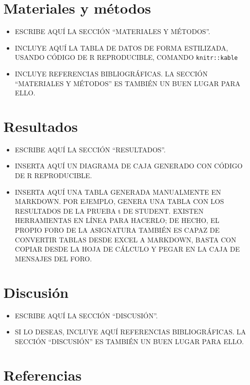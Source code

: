 \documentclass[spanish]{article}
\begin{document}
\section{Materiales y métodos}\label{materiales-y-muxe9todos}

\begin{itemize}
\item
  ESCRIBE AQUÍ LA SECCIÓN ``MATERIALES Y MÉTODOS''.
\item
  INCLUYE AQUÍ LA TABLA DE DATOS DE FORMA ESTILIZADA, USANDO CÓDIGO DE R
  REPRODUCIBLE, COMANDO \texttt{knitr::kable}
\item
  INCLUYE REFERENCIAS BIBLIOGRÁFICAS. LA SECCIÓN ``MATERIALES Y
  MÉTODOS'' ES TAMBIÉN UN BUEN LUGAR PARA ELLO.
\end{itemize}

\section{Resultados}\label{resultados}

\begin{itemize}
\item
  ESCRIBE AQUÍ LA SECCIÓN ``RESULTADOS''.
\item
  INSERTA AQUÍ UN DIAGRAMA DE CAJA GENERADO CON CÓDIGO DE R
  REPRODUCIBLE.
\item
  INSERTA AQUÍ UNA TABLA GENERADA MANUALMENTE EN MARKDOWN. POR EJEMPLO,
  GENERA UNA TABLA CON LOS RESULTADOS DE LA PRUEBA t DE STUDENT. EXISTEN
  HERRAMIENTAS EN LÍNEA PARA HACERLO; DE HECHO, EL PROPIO FORO DE LA
  ASIGNATURA TAMBIÉN ES CAPAZ DE CONVERTIR TABLAS DESDE EXCEL A
  MARKDOWN, BASTA CON COPIAR DESDE LA HOJA DE CÁLCULO Y PEGAR EN LA CAJA
  DE MENSAJES DEL FORO.
\end{itemize}

\section{Discusión}\label{discusiuxf3n}

\begin{itemize}
\item
  ESCRIBE AQUÍ LA SECCIÓN ``DISCUSIÓN''.
\item
  SI LO DESEAS, INCLUYE AQUÍ REFERENCIAS BIBLIOGRÁFICAS. LA SECCIÓN
  ``DISCUSIÓN'' ES TAMBIÉN UN BUEN LUGAR PARA ELLO.
\end{itemize}

\section*{Referencias}\label{referencias}



\end{document}
